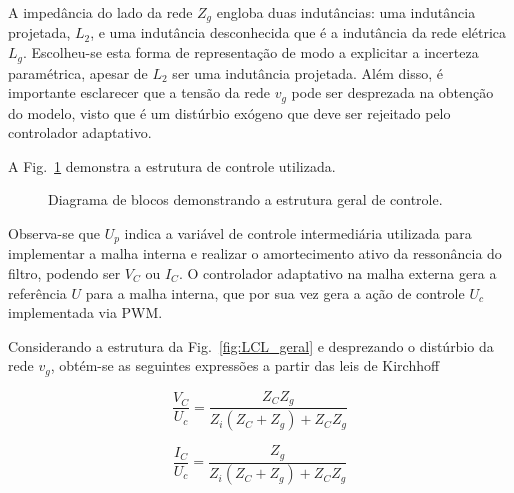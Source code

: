     A impedância do lado da rede $Z_g$ engloba duas indutâncias: uma indutância projetada,
    $L_2$, e uma indutância desconhecida que é a indutância da rede elétrica $L_g$. Escolheu-se
    esta forma de representação de modo a explicitar a incerteza paramétrica, apesar de $L_2$
    ser uma indutância projetada. Além disso, é importante esclarecer que a tensão da rede
    $v_g$ pode ser desprezada na obtenção do modelo, visto que é um distúrbio exógeno que
    deve ser rejeitado pelo controlador adaptativo.

    A Fig.~\ref{fig:estrutura_geral_cascata} demonstra a estrutura de controle utilizada.

    \begin{figure}[htb]
        \renewcommand\figurename{Fig.}
        \caption{Diagrama de blocos demonstrando a estrutura geral de controle.}
        \label{fig:estrutura_geral_cascata}
    \end{figure}

    Observa-se que $U_p$ indica a variável de controle intermediária utilizada para
    implementar a malha interna e realizar o amortecimento ativo da ressonância do filtro,
    podendo ser $V_C$ ou $I_C$. O controlador adaptativo na malha externa gera a referência
    $U$ para a malha interna, que por sua vez gera a ação de controle $U_c$ implementada
    via PWM.

    Considerando a estrutura da Fig.~\ref{fig:LCL_geral} e desprezando o distúrbio da
    rede $v_g$, obtém-se as seguintes expressões a partir das leis de Kirchhoff

    \begin{equation}
        \frac{V_C}{U_c} = \frac{Z_C Z_g}{Z_i \left( Z_C + Z_g \right) + Z_C Z_g}
        \label{eq:vc_uc}
    \end{equation}

    \begin{equation}
        \frac{I_C}{U_c} = \frac{Z_g}{Z_i \left( Z_C + Z_g \right) + Z_C Z_g}
        \label{eq:ic_uc}
    \end{equation}

